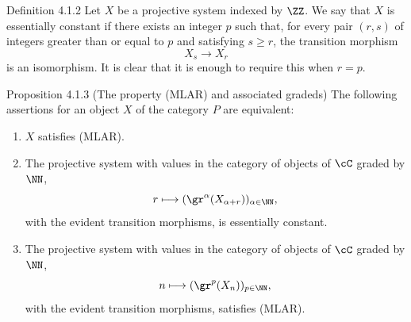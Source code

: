 \begin{statement}{Definition 4.1.2}
Let $X$ be a projective system indexed by $\ZZ$. We say that $X$ is essentially constant if there exists an integer $p$ such that, for every pair $(r,s)$ of integers greater than or equal to $p$ and satisfying $s\ge r$, the transition morphism
\[
X_s\longrightarrow X_r
\]
is an isomorphism. It is clear that it is enough to require this when $r=p$.
\end{statement}

\begin{statement}{Proposition 4.1.3 (The property (MLAR) and associated gradeds)}
The following assertions for an object $X$ of the category $P$ are equivalent:
\begin{enumerate}[label=(\roman*)]
\item $X$ satisfies (MLAR).
\item The projective system with values in the category of objects of $\cC$ graded by $\NN$,
\[
r\longmapsto (\gr^\alpha(X_{\alpha+r}))_{\alpha\in\NN},
\]
with the evident transition morphisms, is essentially constant.
\item The projective system with values in the category of objects of $\cC$ graded by $\NN$,
\[
n\longmapsto (\gr^p(X_n))_{p\in\NN},
\]
with the evident transition morphisms, satisfies (MLAR).
\end{enumerate}
\end{statement}

